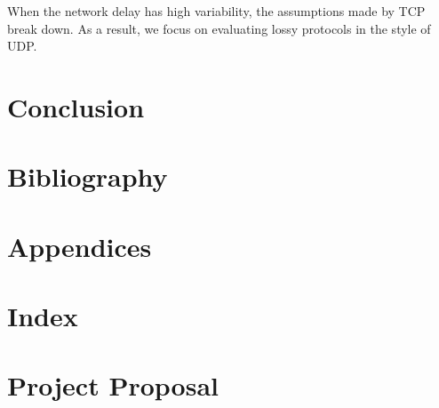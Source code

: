 \documentclass[withindex,glossary,openany]{cam-thesis}
\begin{document}
When the network delay has high variability, the assumptions made by TCP break down. As a result, we focus on evaluating lossy protocols in the style of UDP.


\chapter{Conclusion}

\chapter{Bibliography}

\chapter{Appendices}

\chapter{Index}

\chapter{Project Proposal}




\printthesisindex
\end{document}
